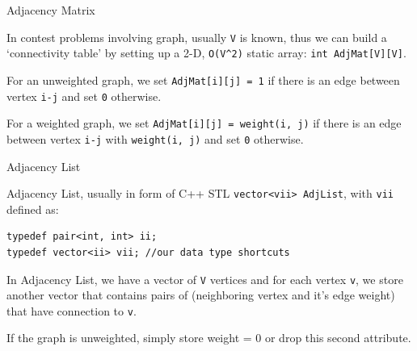 \documentclass[ignorenonframetext,]{beamer}
\begin{document}
\begin{frame}[fragile]{Adjacency Matrix}
\protect\hypertarget{adjacency-matrix}{}

In contest problems involving graph, usually \texttt{V} is known, thus
we can build a `connectivity table' by setting up a 2-D,
\texttt{O(V\^{}2)} static array: \texttt{int\ AdjMat{[}V{]}{[}V{]}}.

For an unweighted graph, we set \texttt{AdjMat{[}i{]}{[}j{]}\ =\ 1} if
there is an edge between vertex \texttt{i-j} and set \texttt{0}
otherwise.

For a weighted graph, we set
\texttt{AdjMat{[}i{]}{[}j{]}\ =\ weight(i,\ j)} if there is an edge
between vertex \texttt{i-j} with \texttt{weight(i,\ j)} and set
\texttt{0} otherwise.

\end{frame}

\begin{frame}[fragile]{Adjacency List}
\protect\hypertarget{adjacency-list}{}

Adjacency List, usually in form of C++ STL
\texttt{vector\textless{}vii\textgreater{}\ AdjList}, with \texttt{vii}
deﬁned as:

\begin{verbatim}
typedef pair<int, int> ii;
typedef vector<ii> vii; //our data type shortcuts
\end{verbatim}

In Adjacency List, we have a vector of \texttt{V} vertices and for each
vertex \texttt{v}, we store another vector that contains pairs of
(neighboring vertex and it's edge weight) that have connection to
\texttt{v}.

If the graph is unweighted, simply store weight = 0 or drop this second
attribute.

\end{frame}
\end{document}
